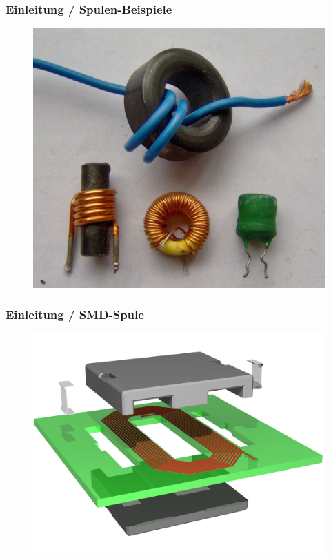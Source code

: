 \begin{frame}
  \frametitle{Einleitung / Spulen-Beispiele}
  \begin{center}
    \begin{figure}
      \includegraphics[height=0.75\textheight,width=\textwidth,keepaspectratio]{e06/Spule.jpg}
    \end{figure}
  \end{center}
\end{frame}

\begin{frame}
  \frametitle{Einleitung / SMD-Spule}
  \begin{center}
    \begin{figure}
      \includegraphics[height=0.75\textheight,width=\textwidth,keepaspectratio]{e06/smd-Spule.png}
    \end{figure}
  \end{center}
\end{frame}


